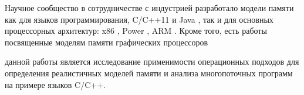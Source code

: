 
{\progress}
Научное сообщество в сотрудничестве с индустрией разработало модели
памяти как для языков программирования, C/C++11 \cite{Batty-al:POPL11} и Java \cite{Manson-al:POPL05},
так и для основных процессорных архитектур: 
x86 \cite{Sewell-al:CACM10},
Power \cite{Sarkar-al:PLDI11,Alglave-al:TOPLAS14},
ARM \cite{Flur-al:POPL16,Pulte-al:draft17}.
Кроме того, есть работы посвященные моделям памяти графических
процессоров 



{\aim} данной работы является исследование применимости операционных
подходов для определения реалистичных моделей памяти и анализа
многопоточных программ на примере языков C/C++.

